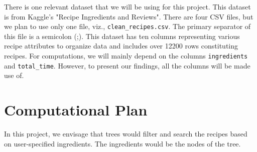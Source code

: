 \documentclass[fontsize=11pt]{article}
\begin{document}
    There is one relevant dataset that we will be using for this project. This dataset is from Kaggle's "Recipe Ingredients and Reviews". There are four CSV files, but we plan to use only one file, viz., \texttt{clean\_recipes.csv}. The primary separator of this file is a semicolon (;). This dataset has ten columns representing various recipe attributes to organize data and includes over 12200 rows constituting recipes. For computations, we will mainly depend on the columns \texttt{ingredients} and \texttt{total\_time}. However, to present our findings, all the columns will be made use of.


    \section*{Computational Plan}



    In this project, we envisage that trees would filter and search the recipes based on user-specified ingredients. The ingredients would be the nodes of the tree. \\
\end{document}
